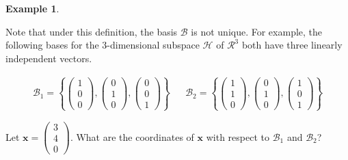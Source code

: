 \documentclass[
]{book}
\theoremstyle{definition}
\theoremstyle{definition}
\newtheorem{example}{Example}[chapter]
\theoremstyle{definition}
\theoremstyle{remark}
\begin{document}
\begin{example}
\protect\hypertarget{exm:unlabeled-div-96}{}\label{exm:unlabeled-div-96}

Note that under this definition, the basis \(\mathcal{B}\) is not unique. For example, the following bases for the 3-dimensional subspace \(\mathcal{H}\) of \(\mathcal{R}^3\) both have three linearly independent vectors.

\[
\begin{aligned}
\mathcal{B}_1 =  \left\{ \begin{pmatrix} 1 \\ 0 \\ 0 \end{pmatrix}, \begin{pmatrix} 0 \\ 1 \\ 0 \end{pmatrix}, \begin{pmatrix} 0 \\ 0 \\ 1 \end{pmatrix} \right\} && \mathcal{B}_2 = \left\{ \begin{pmatrix} 1 \\ 1 \\ 0 \end{pmatrix}, \begin{pmatrix} 0 \\ 1 \\ 0 \end{pmatrix}, \begin{pmatrix} 1 \\ 0 \\ 1 \end{pmatrix} \right\} 
\end{aligned}
\]

Let \(\mathbf{x} = \begin{pmatrix} 3 \\ 4 \\ 0 \end{pmatrix}\). What are the coordinates of \(\mathbf{x}\) with respect to \(\mathcal{B}_1\) and \(\mathcal{B}_2\)?

\end{example}
\end{document}
